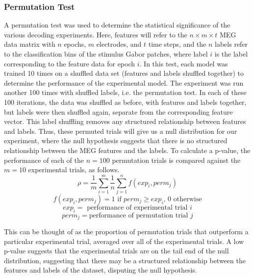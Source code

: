 \documentclass[../main.tex]{subfiles}
\begin{document}
\subsubsection{Permutation Test}
A permutation test was used to determine the statistical significance of the various decoding experiments. Here, features will refer to the $n \times m \times t$ MEG data matrix with $n$ epochs, $m$ electrodes, and $t$ time steps, and the $n$ labels refer to the classification bins of the stimulus Gabor patches, where label $i$ is the label corresponding to the feature data for epoch $i$. In this test, each model was trained 10 times on a shuffled data set (features and labels shuffled together) to determine the performance of the experimental model.  The experiment was run another 100 times with shuffled labels, i.e. the permutation test. In each of these 100 iterations, the data was shuffled as before, with features and labels together, but labels were then shuffled again, separate from the corresponding feature vector. This label shuffling removes any structured relationship between features and labels. Thus, these permuted trials will give us a null distribution for our experiment, where the null hypothesis suggests that there is no structured relationship between the MEG features and the labels. To calculate a p-value, the performance of each of the $n = 100$ permutation trials is compared against the $m = 10$ experimental trials, as follows. 
$$\rho = \frac{1}{m}\sum_{i=1}^{m}{\frac{1}{n}\sum_{j=1}^{n}{f(exp_i, perm_j)}}$$
$$f(exp_i, perm_j) = 1 \mbox{ if } perm_j \geq exp_i \mbox{, } 0 \mbox{ otherwise}$$
$$ exp_i = \mbox{ performance of experimental trial } i$$
$$ perm_j = \mbox{performance of permutation trial } j $$

This can be thought of as the proportion of permutation trials that outperform a particular experimental trial, averaged over all of the experimental trials. A low p-value suggests that the experimental trials are on the tail end of the null distribution, suggesting that there may be a structured relationship between the features and labels of the dataset, disputing the null hypothesis.
\end{document}
